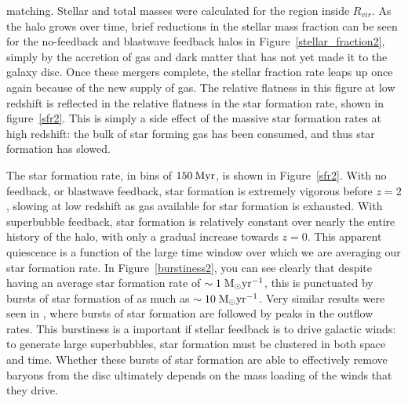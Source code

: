 matching.  Stellar and total masses were calculated for the region inside
$R_{vir}$.  As the halo grows over time, brief reductions in the stellar mass
fraction can be seen for the no-feedback and blastwave feedback halos in
Figure~\ref{stellar_fraction2}, simply by the accretion of gas and dark matter
that has not yet made it to the galaxy disc.  Once these mergers complete, the
stellar fraction rate leaps up once again because of the new supply of gas.  The
relative flatness in this figure at low redshift is reflected in the relative
flatness in the star formation rate, shown in figure~\ref{sfr2}.  This is simply
a side effect of the massive star formation rates at high redshift:  the bulk of
star forming gas has been consumed, and thus star formation has slowed.

The star formation rate, in bins of $150\: \rm{Myr}$, is shown in
Figure~\ref{sfr2}.  With no feedback, or blastwave feedback, star formation is
extremely vigorous before $z=2$, slowing at low redshift as gas available for
star formation is exhausted.  With superbubble feedback, star formation is
relatively constant over nearly the entire history of the halo, with only a
gradual increase towards $z=0$.  This apparent quiescence is a function of the
large time window over which we are averaging our star formation rate.  In
Figure~\ref{burstiness2}, you can see clearly that despite having an average star
formation rate of $\sim1\; \rm{M_\odot yr^{-1}}$, this is punctuated by bursts
of star formation of as much as $\sim10\; \rm{M_\odot yr^{-1}}$.  Very similar
results were seen in \citet{Muratov2015}, where bursts of star formation are
followed by peaks in the outflow rates.  This burstiness is a important if
stellar feedback is to drive galactic winds:  to generate large superbubbles,
star formation must be clustered in both space and time.  Whether these bursts
of star formation are able to effectively remove baryons from the disc
ultimately depends on the mass loading of the winds that they drive.

